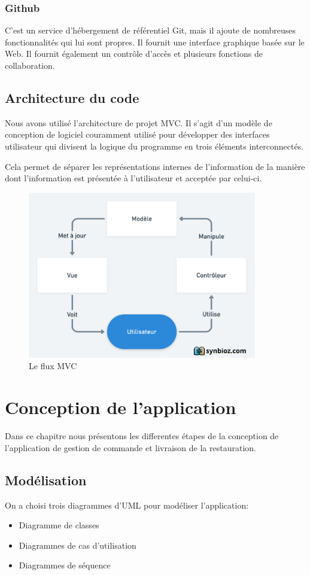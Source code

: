\documentclass[french, a4paper, 12pt]{report}
\begin{document}
		\subsection*{Github} C'est un service d'hébergement de référentiel Git, mais il ajoute de nombreuses fonctionnalités qui lui sont propres. Il fournit une interface graphique basée sur le Web. Il fournit également un contrôle d'accès et plusieurs fonctions de collaboration.
	\section{Architecture du code} %
		Nous avons utilisé l'architecture de projet MVC. Il s'agit d'un modèle de conception de logiciel couramment utilisé pour développer des interfaces utilisateur qui divisent la logique du programme en trois éléments interconnectés.

Cela permet de séparer les représentations internes de l'information de la manière dont l'information est présentée à l'utilisateur et acceptée par celui-ci.
\begin{figure}[!h]
  \center
  \includegraphics[width=10cm]{mvc.png}
  \caption{Le flux MVC}
  \label{fig:fluxmvc}
\end{figure}

\newpage
\chapter{Conception de l'application} Dans ce chapitre nous présentons les differentes étapes de la conception de l'application de gestion de commande et livraison de la restauration.
	\section{Modélisation} On a choisi trois diagrammes d’UML pour modéliser l'application:
		\begin{itemize}
			\item Diagramme de classes
			\item Diagrammes de cas d’utilisation
			\item Diagrammes de séquence
		\end{itemize}
		
\end{document}
